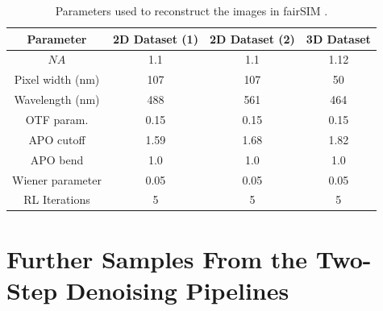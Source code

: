\documentclass[12pt]{article}
\newcommand\NA{\mathit{NA}}
\begin{document}
\begin{table}[htp]
    \centering
    \begin{tabular}{| c | c | c | c |}
        \hline
        Parameter & 2D Dataset (1) & 2D Dataset (2) & 3D Dataset \\
        \hline
        $\NA$  & 1.1 & 1.1 & 1.12 \\
        \hline
        Pixel width (nm) & 107 & 107 & 50 \\
        \hline
        Wavelength (nm) & 488 & 561 & 464 \\
        \hline
        OTF param.  & 0.15 & 0.15 & 0.15 \\
        \hline
        APO cutoff & 1.59 & 1.68 & 1.82 \\
        \hline
        APO bend  & 1.0 & 1.0 & 1.0 \\
        \hline
        Wiener parameter & 0.05 & 0.05 & 0.05 \\
        \hline
        RL Iterations & 5 & 5 & 5\\
        \hline

    \end{tabular}
    \caption{Parameters used to reconstruct the images in fairSIM \cite{fairSIM}.}
    \label{tab:reconparams}
\end{table}

\newpage

\section{Further Samples From the Two-Step Denoising Pipelines}
\end{document}
